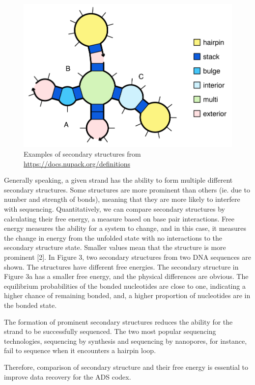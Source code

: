 \documentclass{article}
\begin{document}
\begin{figure}[!h]
\centering
\includegraphics[scale=1]{secondary_structures_overview.png}
\caption{Examples of secondary structures from \url{https://docs.nupack.org/definitions}}   
\end{figure} 


Generally speaking, a given strand has the ability to form multiple different secondary structures. Some structures are more prominent than others (ie. due to number and strength of bonds), meaning that they are more likely to interfere with sequencing. Quantitatively, we can compare secondary structures by calculating their free energy, a measure based on base pair interactions. Free energy measures the ability for a system to change, and in this case, it measures the change in energy from the unfolded state with no interactions to the secondary structure state. Smaller values mean that the structure is more prominent [2]. In Figure 3, two secondary structures from two DNA sequences are shown. The structures have different free energies. The secondary structure in Figure 3a has a smaller free energy, and the physical differences are obvious. The equilibrium probabilities of the bonded nucleotides are close to one, indicating a higher chance of remaining bonded, and, a higher proportion of nucleotides are in the bonded state.

The formation of prominent secondary structures reduces the ability for the strand to be successfully sequenced. The two most popular sequencing technologies, sequencing by synthesis and sequencing by nanopores, for instance, fail to sequence when it encounters a hairpin loop.

Therefore, comparison of secondary structure and their free energy is essential to improve data recovery for the ADS codex. 
\end{document}
